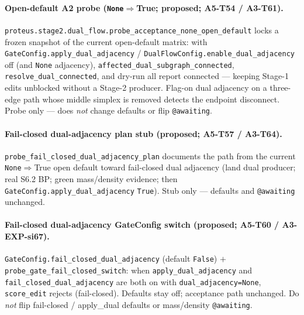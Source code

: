 \documentclass[11pt]{article}
\begin{document}
\paragraph{Open-default A2 probe (\texttt{None}$\Rightarrow$True; proposed;
A5-T54 / A3-T61).}
\texttt{proteus.stage2.dual\_flow.probe\_acceptance\_none\_open\_default}
locks a frozen snapshot of the current open-default matrix: with
\texttt{GateConfig.apply\_dual\_adjacency} /
\texttt{DualFlowConfig.enable\_dual\_adjacency} off (and \texttt{None}
adjacency), \texttt{affected\_dual\_subgraph\_connected},
\texttt{resolve\_dual\_connected}, and dry-run all report connected ---
keeping Stage-1 edits unblocked without a Stage-2 producer. Flag-on dual
adjacency on a three-edge path whose middle simplex is removed detects the
endpoint disconnect. Probe only --- does \emph{not} change defaults or flip
\texttt{@awaiting}.

\paragraph{Fail-closed dual-adjacency plan stub (proposed; A5-T57 /
A3-T64).}
\texttt{probe\_fail\_closed\_dual\_adjacency\_plan} documents the path from
the current \texttt{None}$\Rightarrow$True open default toward
fail-closed dual adjacency (land dual producer; real S6.2 BP; green
mass/density evidence; then \texttt{GateConfig.apply\_dual\_adjacency}
\texttt{True}). Stub only --- defaults and \texttt{@awaiting} unchanged.

\paragraph{Fail-closed dual-adjacency GateConfig switch (proposed;
A5-T60 / A3-EXP-si67).}
\texttt{GateConfig.fail\_closed\_dual\_adjacency} (default
\texttt{False}) $+$ \texttt{probe\_gate\_fail\_closed\_switch}: when
\texttt{apply\_dual\_adjacency} and \texttt{fail\_closed\_dual\_adjacency}
are both on with \texttt{dual\_adjacency=None}, \texttt{score\_edit}
rejects (fail-closed). Defaults stay off; acceptance path unchanged.
Do \emph{not} flip fail-closed / apply\_dual defaults or mass/density
\texttt{@awaiting}.
\end{document}
